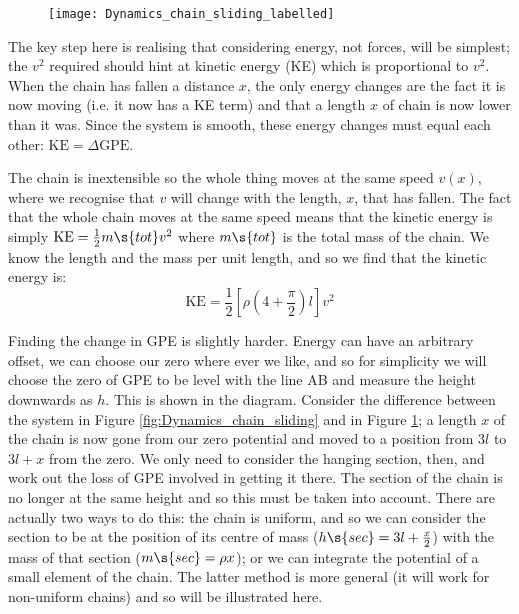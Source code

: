 \begin{hint}
{\begin{enumerate}
\begin{figure}[h!]
\centering
\texttt{[image: Dynamics\_chain\_sliding\_labelled]}
\caption{}
\label{fig:Dynamics_chain_sliding_labelled}
\end{figure}

The key step here is realising that considering energy, not forces, will be simplest; the $v^{2}$ required should hint at kinetic energy (KE) which is proportional to $v^{2}$. When the chain has fallen a distance $x$, the only energy changes are the fact it is now moving (i.e. it now has a KE term) and that a length $x$ of chain is now lower than it was. Since the system is smooth, these energy changes must equal each other: $\textrm{KE} = \Delta \textrm{GPE}$.

The chain is inextensible so the whole thing moves at the same speed $v(x)$, where we recognise that $v$ will change with the length, $x$, that has fallen. The fact that the whole chain moves at the same speed means that the kinetic energy is simply $\textrm{KE} = \frac{1}{2}m\s{tot}v^{2}$ where $m\s{tot}$ is the total mass of the chain. We know the length and the mass per unit length, and so we find that the kinetic energy is:
	\begin{equation*} \textrm{KE} = \frac{1}{2}\left[\rho\left(4 + \frac{\pi}{2}\right)l\right]v^{2} \end{equation*}

Finding the change in GPE is slightly harder. Energy can have an arbitrary offset, we can choose our zero where ever we like, and so for simplicity we will choose the zero of GPE to be level with the line AB and measure the height downwards as $h$. This is shown in the diagram. Consider the difference between the system in Figure \ref{fig:Dynamics_chain_sliding} and in Figure \ref{fig:Dynamics_chain_sliding_labelled}; a length $x$ of the chain is now gone from our zero potential and moved to a position from $3l$ to $3l + x$ from the zero. We only need to consider the hanging section, then, and work out the loss of GPE involved in getting it there. The section of the chain is no longer at the same height and so this must be taken into account. There are actually two ways to do this: the chain is uniform, and so we can consider the section to be at the position of its centre of mass ($h\s{sec} = 3l + \frac{x}{2}$) with the mass of that section ($m\s{sec} = \rho x$); or we can integrate the potential of a small element of the chain. The latter method is more general (it will work for non-uniform chains) and so will be illustrated here.


\end{enumerate}}
\end{hint}

